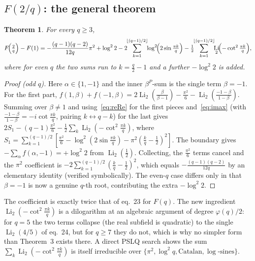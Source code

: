 \documentclass[11pt]{article}
\DeclareMathOperator{\Li}{Li}
\theoremstyle{plain}\newtheorem{theorem}{Theorem}\newtheorem{proposition}[theorem]{Proposition}
\theoremstyle{remark}\newtheorem{remark}[theorem]{Remark}
\begin{document}
\subsection{$F(2/q)$: the general theorem}
\begin{theorem}\label{thm:F2q}
For every $q\ge3$,
\[
  F\!\Bigl(\tfrac2q\Bigr)-F(1)=-\frac{(q-1)(q-2)}{12q}\pi^2+\log^2 2
  -2\!\!\sum_{k=1}^{\lfloor(q-1)/2\rfloor}\!\!\log^2\!\Bigl(2\sin\tfrac{\pi k}{q}\Bigr)
  -\tfrac12\!\!\sum_{k=1}^{\lfloor(q-1)/2\rfloor}\!\!\Li_2\!\Bigl(-\cot^2\tfrac{\pi k}{q}\Bigr),
\]
where for even $q$ the two sums run to $k=\tfrac q2-1$ and a further $-\log^2 2$ is added.
\end{theorem}
\begin{proof}[Proof (odd $q$)]
Here $\alpha\in\{1,-1\}$ and the inner $\beta^P$-sum is the single term $\beta=-1$. For the first part,
$f(1,\beta)+f(-1,\beta)=2\Li_2(\tfrac{\beta}{\beta-1})-\tfrac{\pi^2}{6}-\Li_2(\tfrac{-1-\beta}{1-\beta})$.
Summing over $\beta\neq1$ and using~\eqref{eq:reRe} for the first pieces and~\eqref{eq:imax}
(with $\tfrac{-1-\beta}{1-\beta}=-i\cot\tfrac{\pi k}q$, pairing $k\leftrightarrow q-k$) for the last gives
$2S_1-(q-1)\tfrac{\pi^2}{6}-\tfrac12\sum_{k}\Li_2(-\cot^2\tfrac{\pi k}q)$, where
$S_1=\sum_{k=1}^{(q-1)/2}[\tfrac{\pi^2}{6}-\log^2(2\sin\tfrac{\pi k}q)-\pi^2(\tfrac kq-\tfrac12)^2]$. The boundary
gives $-\sum_\alpha f(\alpha,-1)=+\log^2 2$ from $\Li_2(\tfrac12)$. Collecting, the $\tfrac{\pi^2}{6}$ terms
cancel and the $\pi^2$ coefficient is $-2\sum_{k=1}^{(q-1)/2}(\tfrac kq-\tfrac12)^2$, which equals
$-\tfrac{(q-1)(q-2)}{12q}$ by an elementary identity (verified symbolically). The even-$q$ case differs only
in that $\beta=-1$ is now a genuine $q$-th root, contributing the extra $-\log^2 2$.
\end{proof}
The coefficient is exactly twice that of eq.~23 for $F(q)$. The new ingredient $\Li_2(-\cot^2\frac{\pi k}q)$
is a dilogarithm at an algebraic argument of degree $\varphi(q)/2$: for $q=5$ the two terms collapse (the real
subfield is quadratic) to the single $\Li_2(4/5)$ of eq.~24, but for $q\ge7$ they do not, which is why no
simpler form than Theorem~3 exists there. A direct PSLQ search shows the sum
$\sum_k\Li_2(-\cot^2\frac{\pi k}q)$ is itself irreducible over $\{\pi^2,\log^2 q,\text{Catalan},\log\text{-sines}\}$.
\end{document}

